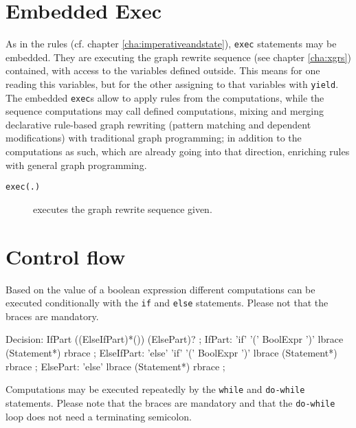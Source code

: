 \section{Embedded Exec} 

As in the rules (cf. chapter \ref{cha:imperativeandstate}), \texttt{exec} statements may be embedded.
They are executing the graph rewrite sequence (see chapter \ref{cha:xgrs}) contained, with access to the variables defined outside.
This means for one reading this variables, but for the other assigning to that variables with \texttt{yield}.
The embedded \texttt{exec}s allow to apply rules from the computations, while the sequence computations may call defined computations, mixing and merging declarative rule-based graph rewriting (pattern matching and dependent modifications) with traditional graph programming; in addition to the computations as such, which are already going into that direction, enriching rules with general graph programming.

\begin{description}
\item[\texttt{exec(.)}] executes the graph rewrite sequence given. 
\end{description}

\section{Control flow} \label{sub:controlflow}

Based on the value of a boolean expression different computations can be executed conditionally with the \texttt{if} and \texttt{else} statements. Please not that the braces are mandatory.

\begin{rail} 
  Decision: IfPart ((ElseIfPart)*()) (ElsePart)? ;
	IfPart: 'if' '(' BoolExpr ')' lbrace (Statement*) rbrace ;
	ElseIfPart: 'else' 'if' '(' BoolExpr ')' lbrace (Statement*) rbrace ;
	ElsePart: 'else' lbrace (Statement*) rbrace ;
\end{rail}

Computations may be executed repeatedly by the \texttt{while} and \texttt{do-while} statements. Please note that the braces are mandatory and that the \texttt{do-while} loop does not need a terminating semicolon.

